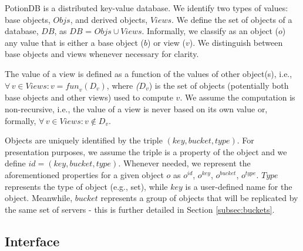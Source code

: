 \documentclass[sigplan,10pt]{acmart}
\begin{document}
PotionDB is a distributed key-value database.
We identify two types of values: base objects, $\mathit{Objs}$, and derived objects, $\mathit{Views}$.
We define the set of objects of a database, $\mathit{DB}$, as $\mathit{DB}$ = $\mathit{Objs} \cup \mathit{Views}$.
Informally, we classify as an object ($o$) any value that is either a base object ($b$) or view ($v$).
We distinguish between base objects and views whenever necessary for clarity.

The value of a view is defined as a function of the values of other object(s), i.e., 
$\forall\, v \in \mathit{Views} : v = \mathit{fun}_v(D_v)$, 
where \emph($D_v$) is the set of objects (potentially both base objects and other views) used to compute $v$.
We assume the computation is non-recursive, i.e., the value of a view is never based on its own value or, formally, 
$\forall\, v \in \mathit{Views} : v \notin D_v$.

Objects are uniquely identified by the triple $\mathit{(key, bucket, type)}$.
For presentation purposes, we assume the triple is a property of the object and we define $\mathit{id} = \mathit{(key, bucket, type)}$.
Whenever needed, we represent the aforementioned properties for a given object $o$ as
$o^{\mathit{id}}$, $o^{\mathit{key}}$, $o^{\mathit{bucket}}$, $o^{\mathit{type}}$.
$\mathit{Type}$ represents the type of object (e.g., set), while $\mathit{key}$ is a user-defined name for the object.
Meanwhile, $\mathit{bucket}$ represents a group of objects that will be replicated by the same set of servers - this is further detailed in Section \ref{subsec:buckets}.

\subsection{Interface}
\label{subsec:interface}
\end{document}
